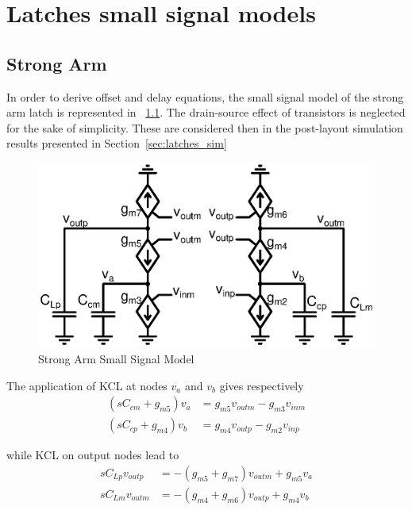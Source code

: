 \chapter{Latches small signal models}
\label{appx:latch_models}
\section{Strong Arm}
In order to derive offset and delay equations, the small signal model of the strong arm latch is represented in \figurename~\ref{fig:annexe_sa_small_signal}. The drain-source effect of transistors is neglected for the sake of simplicity. These are considered then in the post-layout simulation results presented in Section~\ref{sec:latches_sim}

\begin{figure}[htp]
\centering
\includegraphics[width=\textwidth]{Chapter7/Figs/sa_small_signal_model.ps}
\caption{Strong Arm Small Signal Model}
\label{fig:annexe_sa_small_signal}
\end{figure}

The application of KCL at nodes \(v_a\) and \(v_b\) gives respectively
\begin{align}
    \left(sC_{cm}+g_{m5}\right)v_a &= g_{m5}v_{outm} - g_{m3}v_{inm} \\
    \left(sC_{cp}+g_{m4}\right)v_b &= g_{m4}v_{outp} - g_{m2}v_{inp}
    \label{eqn:annexe_va_vb}
\end{align}

while KCL on output nodes lead to
\begin{align}
    sC_{Lp} v_{outp} &= -(g_{m5}+g_{m7})v_{outm} + g_{m5}v_{a} \\
    sC_{Lm} v_{outm} &= -(g_{m4}+g_{m6})v_{outp} + g_{m4}v_{b}
\end{align}

